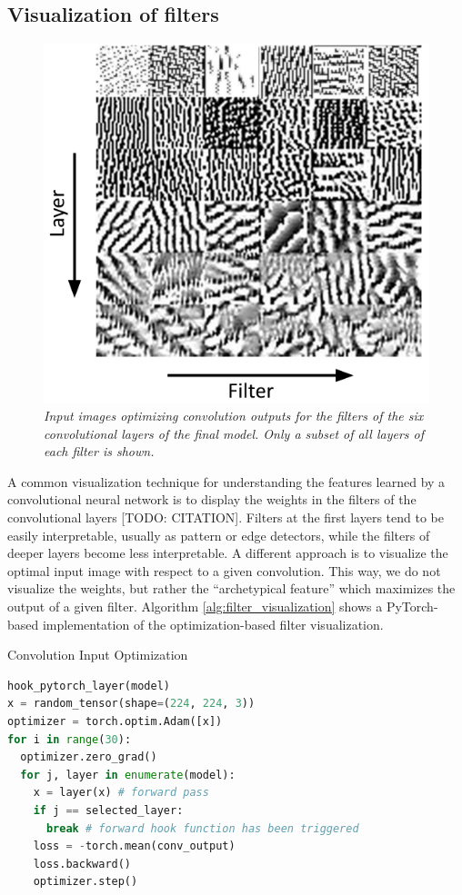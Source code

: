 \documentclass[a4paper]{article}
\begin{document}
\subsection{Visualization of filters}
\label{sec:filter_visualization}
\begin{figure}[t]
     \centering
     \includegraphics[width=.9\linewidth]{graphics/filters}
     \caption{\textit{Input images optimizing convolution outputs for the filters of the six convolutional layers of the final model. Only a subset of all layers of each filter is shown.}}
     \label{fig:filters}
\end{figure}
A common visualization technique for understanding the features learned by a convolutional neural network is to display the weights in the filters of the convolutional layers [TODO: CITATION]. Filters at the first layers tend to be easily interpretable, usually as pattern or edge detectors, while the filters of deeper layers become less interpretable. A different approach is to visualize the optimal input image with respect to a given convolution. This way, we do not visualize the weights, but rather the \enquote{archetypical feature} which maximizes the output of a given filter. Algorithm \ref{alg:filter_visualization} shows a PyTorch-based implementation of the optimization-based filter visualization.

\begin{algorithm}
     \caption{Convolution Input Optimization}\label{alg:filter_visualization}
     \begin{lstlisting}[language=Python]
hook_pytorch_layer(model)
x = random_tensor(shape=(224, 224, 3))
optimizer = torch.optim.Adam([x])
for i in range(30):
  optimizer.zero_grad()
  for j, layer in enumerate(model):
    x = layer(x) # forward pass
    if j == selected_layer:
      break # forward hook function has been triggered
    loss = -torch.mean(conv_output)
    loss.backward()
    optimizer.step()
     \end{lstlisting}
\end{algorithm}
\end{document}
